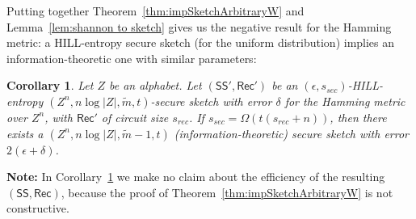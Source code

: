 \documentclass[11pt]{article}
\newcommand{\thref}[1]{\mbox{Theorem~\ref{#1}}}
\newcommand{\corref}[1]{\mbox{Corollary~\ref{#1}}}
\newcommand{\lemref}[1]{\mbox{Lemma~\ref{#1}}}
\newcommand{\class}[1]{{\ensuremath{\mathsf{#1}}}}
\newcommand{\sketch}{\ensuremath{\class{SS}}\xspace}
\newcommand{\rec}{\ensuremath{\class{Rec}}\xspace}
\newcommand{\hill}{\ensuremath{\mathtt{HILL}}\xspace}
\newcommand{\Hav}{\tilde{\mathrm{H}}_\infty}
\newtheorem{proposition}[theorem]{Proposition}
\newtheorem{corollary}[theorem]{Corollary}
\newtheorem{construction}[theorem]{Construction}
\begin{document}
Putting together \thref{thm:impSketchArbitraryW} and \lemref{lem:shannon to sketch} gives us the negative result for the Hamming metric: a HILL-entropy secure sketch (for the uniform distribution) implies an information-theoretic one with similar parameters:
\begin{corollary}
\label{cor:rec yields sketch}
Let $Z$ be an alphabet. Let $(\sketch', \rec')$ be an $(\epsilon,s_{sec})$-HILL-entropy $(Z^n, n\log |Z|, \tilde{m}, t)$-secure sketch with error $\delta$ for the Hamming metric over $Z^n$, with $\rec'$ of circuit size $s_{rec}$.
If $s_{sec}=\Omega(t(s_{rec} + n))$, then there exists a   $(Z^n, n\log |Z|, \tilde{m}-1,t)$ (information-theoretic) secure sketch with error
$2(\epsilon+\delta)$. 
\end{corollary}
\textbf{Note:} In \corref{cor:rec yields sketch} we make no claim about the efficiency of the resulting  $(\sketch, \rec)$, because the proof of \thref{thm:impSketchArbitraryW} is not constructive.


\end{document}
